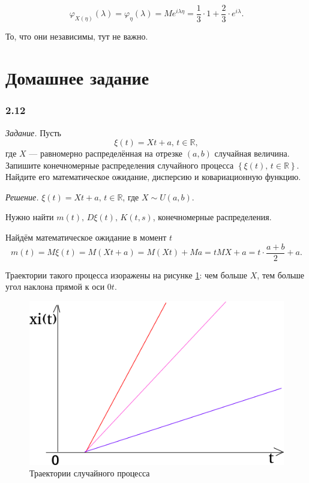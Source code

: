 $$ \varphi_{X \left( \eta \right) } \left( \lambda \right) =
  \varphi_{ \eta } \left( \lambda \right) =
  Me^{i \lambda \eta } =
  \frac{1}{3} \cdot 1 + \frac{2}{3} \cdot e^{i \lambda }.$$

То, что они независимы, тут не важно.

\section*{Домашнее задание}

\subsubsection*{2.12}

\textit{Задание.}
Пусть
$$ \xi \left( t \right) =
  Xt + a, \,
  t \in \mathbb{R},$$
где $X$ --- равномерно распределённая на отрезке $ \left( a, b \right) $ случайная величина.
Запишите конечномерные распределения случайного процесса
$ \left\{ \xi \left( t \right), \, t \in \mathbb{R} \right\} $.
Найдите его математическое ожидание, дисперсию и ковариационную функцию.

\textit{Решение.}
$ \xi \left( t \right) = Xt + a, \, t \in \mathbb{R}$, где $X \sim U \left( a, b \right) $.

Нужно найти $m \left( t \right), \, D \xi \left( t \right), \, K \left( t, s \right) $,
конечномерные распределения.

Найдём математическое ожидание в момент $t$
$$m \left( t \right) =
  M \xi \left( t \right) =
  M \left( Xt + a \right) =
  M \left( Xt \right) + Ma =
  tMX + a =
  t \cdot \frac{a + b}{2} + a.$$

Траектории такого процесса изоражены на рисунке \ref{fig:212}: чем больше $X$,
тем больше угол наклона прямой к оси $0t$.

\begin{figure}[h!]
 \centering
 \includegraphics[width=.5\textwidth]{./pictures/2_12.png}
 \caption{Траектории случайного процесса}
 \label{fig:212}
\end{figure}

